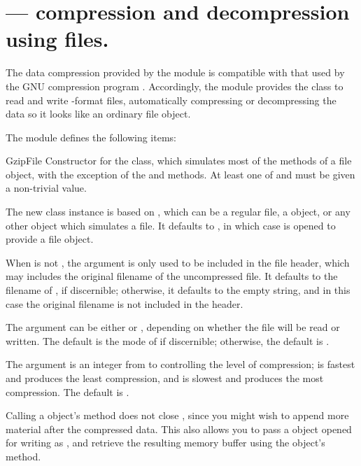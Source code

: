 \section{ ---
          compression and decompression using files.}



The data compression provided by the  module is compatible
with that used by the GNU compression program .
Accordingly, the  module provides the 
class to read and write -format files, automatically
compressing or decompressing the data so it looks like an ordinary
file object.

The module defines the following items:

\begin{classdesc}{GzipFile}{}
Constructor for the  class, which simulates most of
the methods of a file object, with the exception of the
 and  methods.  At least one of
 and  must be given a non-trivial value.

The new class instance is based on , which can be a
regular file, a  object, or any other object which
simulates a file.  It defaults to , in which case
 is opened to provide a file object.

When  is not , the  argument is
only used to be included in the  file header, which may
includes the original filename of the uncompressed file.  It defaults
to the filename of , if discernible; otherwise, it
defaults to the empty string, and in this case the original filename
is not included in the header.

The  argument can be either  or ,
depending on whether the file will be read or written.  The default is
the mode of  if discernible; otherwise, the default is
.

The  argument is an integer from  to
 controlling the level of compression;  is fastest and
produces the least compression, and  is slowest and produces
the most compression.  The default is .

Calling a  object's  method does not
close , since you might wish to append more material
after the compressed data.  This also allows you to pass a
 object opened for writing as , and
retrieve the resulting memory buffer using the 
object's  method.
\end{classdesc}

